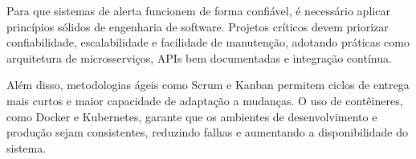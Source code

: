 Para que sistemas de alerta funcionem de forma confiável, é necessário aplicar princípios sólidos de engenharia de software. Projetos críticos devem priorizar confiabilidade, escalabilidade e facilidade de manutenção, adotando práticas como arquitetura de microsserviços, APIs bem documentadas e integração contínua.  

Além disso, metodologias ágeis como Scrum e Kanban permitem ciclos de entrega mais curtos e maior capacidade de adaptação a mudanças. O uso de contêineres, como Docker e Kubernetes, garante que os ambientes de desenvolvimento e produção sejam consistentes, reduzindo falhas e aumentando a disponibilidade do sistema.
